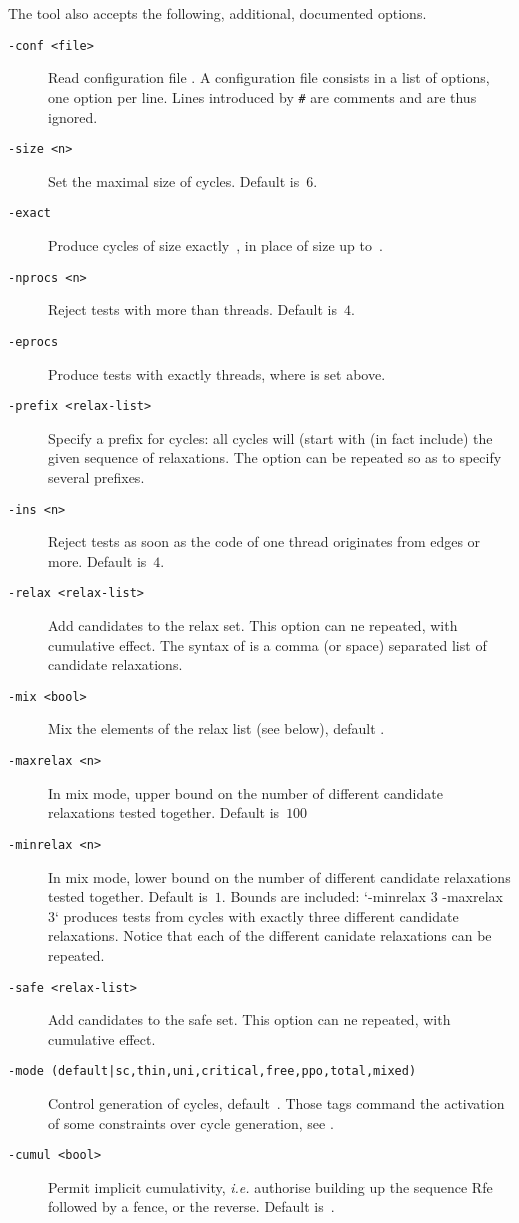 The tool \diy{} also accepts the following, additional, documented options.
\begin{description}
\item[{\tt -conf <file>}] Read configuration file .
A configuration file consists in a list of options, one option per line.
Lines introduced by \verb+#+ are comments and are thus ignored.
\item[{\tt -size <n>}] Set the maximal size of cycles. Default is~$6$.
\item[{\tt -exact}] Produce cycles of size exactly~,
in place of size up to~.
\item[{\tt -nprocs <n>}] Reject tests with more than  threads.
Default is~$4$.
\item[{\tt -eprocs}] Produce tests with exactly 
threads, where  is set above.
\item[{\tt -prefix <relax-list>}] Specify a prefix for cycles: all cycles will (start with (in fact include) the given sequence of relaxations. The option can be repeated so as to specify several prefixes.
\item[{\tt -ins <n>}] Reject tests as soon as the code of one thread
originates from  edges or more. Default is~$4$.
\item[{\tt -relax <relax-list>}] Add candidates to the relax set.  This option can ne repeated, with cumulative effect.
The syntax of  is a comma (or space)
separated list of candidate relaxations.
\item[{\tt -mix <bool>}] Mix the elements of the relax list
(see below), default .
\item[{\tt -maxrelax <n>}]
In mix mode, upper bound on the number of different candidate
relaxations tested together.
Default is~$100$
\item[{\tt -minrelax <n>}]
In mix mode, lower bound on the number of different candidate
relaxations tested together.
Default is~$1$. Bounds are included: `-minrelax 3 -maxrelax 3` produces tests from cycles with exactly three different candidate relaxations. Notice that each of the different canidate relaxations can be repeated.
\item[{\tt -safe <relax-list>}] Add candidates to the safe set. This option can ne repeated, with cumulative effect.
\item[{\tt -mode (default|sc,thin,uni,critical,free,ppo,total,mixed)}]
Control generation  of cycles, default~.
Those tags command the activation of some constraints over cycle
generation, see .
\item[{\tt -cumul <bool>}]
Permit implicit cumulativity,
\emph{i.e.} authorise building up the sequence Rfe followed by a fence,
or the reverse. Default is~.
\end{description}

